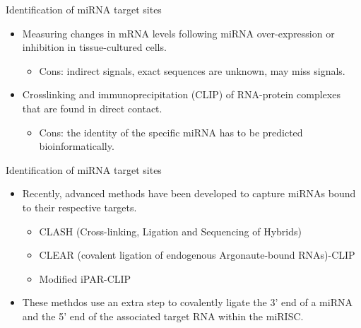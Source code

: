 \documentclass{beamer}
\begin{document}
\begin{frame}{Identification of miRNA target sites}
	\begin{itemize}
\item Measuring changes in mRNA levels following miRNA over-expression or inhibition in tissue-cultured cells.
    \begin{itemize}
    \item Cons: indirect signals, exact sequences are unknown, may miss signals.
    \end{itemize}
		\pause

\item Crosslinking and immunoprecipitation (CLIP) of RNA-protein complexes that are found in direct contact.
  \begin{itemize}
    \item Cons: the identity of the specific miRNA has to be predicted bioinformatically.
    \end{itemize}

\end{itemize}
\end{frame}


\begin{frame}{Identification of miRNA target sites}
	\begin{itemize}
\item Recently, advanced methods have been developed to capture miRNAs bound to their respective targets.
\begin{itemize}
\item CLASH (Cross-linking, Ligation and Sequencing of Hybrids) \cite{helwak2013mapping}
\item CLEAR (covalent ligation of endogenous Argonaute-bound RNAs)-CLIP \cite{darnell_moore2015mirna, scheel2017global}
\item Modified iPAR-CLIP \cite{grosswendt2014unambiguous}
\end{itemize}
\item These methdos use an extra step to covalently ligate the 3' end of a miRNA and the 5' end of the associated target RNA within the miRISC. 
\end{itemize}
\end{frame}
\end{document}
